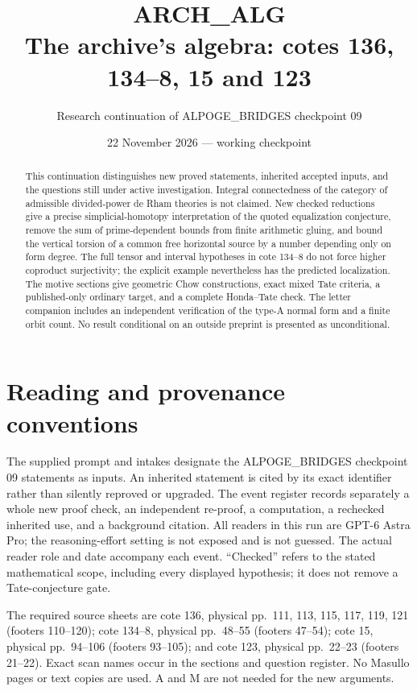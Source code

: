 \documentclass[11pt,a4paper]{article}
\title{ARCH\_ALG\\The archive's algebra: cotes 136, 134--8, 15 and 123}
\author{Research continuation of ALPOGE\_BRIDGES checkpoint 09}
\date{22 November 2026 --- working checkpoint}
\begin{document}
\maketitle
\begin{abstract}
This continuation distinguishes new proved statements, inherited accepted
inputs, and the questions still under active investigation. Integral
connectedness of the category of admissible divided-power de Rham theories
is not claimed. New checked reductions give a precise simplicial-homotopy
interpretation of the quoted equalization conjecture, remove the sum of
prime-dependent bounds from finite arithmetic gluing, and bound the
vertical torsion of a common free horizontal source by a number depending
only on form degree. The full tensor and interval hypotheses in cote
134--8 do not force higher coproduct surjectivity; the explicit example
nevertheless has the predicted localization. The motive sections give
geometric Chow constructions, exact mixed Tate criteria, a published-only
ordinary target, and a complete Honda--Tate check. The letter companion
includes an independent verification of the type-A normal form and a
finite orbit count. No result conditional on an outside preprint is
presented as unconditional.
\end{abstract}
\tableofcontents
\clearpage
\section*{Reading and provenance conventions}
The supplied prompt and intakes designate the ALPOGE\_BRIDGES checkpoint
09 statements as inputs. An inherited statement is cited by its exact
identifier rather than silently reproved or upgraded. The event register
records separately a whole new proof check, an independent re-proof, a
computation, a rechecked inherited use, and a background citation. All
readers in this run are GPT-6 Astra Pro; the reasoning-effort setting is
not exposed and is not guessed. The actual reader role and date accompany
each event. ``Checked'' refers to the stated mathematical scope, including
every displayed hypothesis; it does not remove a Tate-conjecture gate.

The required source sheets are cote 136, physical pp.~111, 113, 115,
117, 119, 121 (footers 110--120); cote 134--8, physical pp.~48--55
(footers 47--54); cote 15, physical pp.~94--106 (footers 93--105);
and cote 123, physical pp.~22--23 (footers 21--22). Exact scan names
occur in the sections and question register. No Masullo pages or text
copies are used. A and M are not needed for the new arguments.
\end{document}
